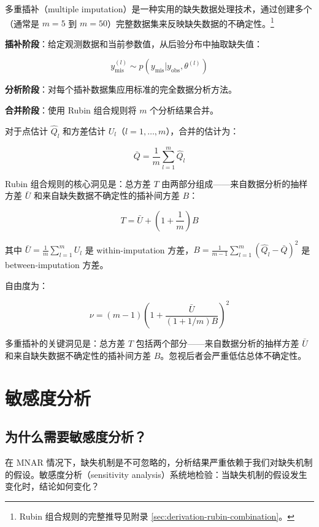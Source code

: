 多重插补（multiple imputation）是一种实用的缺失数据处理技术，通过创建多个（通常是 $m = 5$ 到 $m = 50$）完整数据集来反映缺失数据的不确定性。\footnote{Rubin 组合规则的完整推导见附录 \cref{sec:derivation-rubin-combination}。}

\textbf{插补阶段}：给定观测数据和当前参数值，从后验分布中抽取缺失值：

\[
y_{\text{mis}}^{(l)} \sim p(y_{\text{mis}} | y_{\text{obs}}, \theta^{(l)})
\label{eq:imputation-step}
\]

\textbf{分析阶段}：对每个插补数据集应用标准的完全数据分析方法。

\textbf{合并阶段}：使用 Rubin 组合规则将 $m$ 个分析结果合并。

对于点估计 $\hat{Q}_l$ 和方差估计 $U_l$（$l = 1, \ldots, m$），合并的估计为：

\[
\bar{Q} = \frac{1}{m} \sum_{l=1}^m \hat{Q}_l
\label{eq:rubin-pooled-estimate}
\]

Rubin 组合规则的核心洞见是：总方差 $T$ 由两部分组成——来自数据分析的抽样方差 $\bar{U}$ 和来自缺失数据不确定性的插补间方差 $B$：

\[
T = \bar{U} + \left(1 + \frac{1}{m}\right) B
\label{eq:rubin-total-variance}
\]

其中 $\bar{U} = \frac{1}{m} \sum_{l=1}^m U_l$ 是 within-imputation 方差，$B = \frac{1}{m-1} \sum_{l=1}^m (\hat{Q}_l - \bar{Q})^2$ 是 between-imputation 方差。

自由度为：

\[
\nu = (m-1)\left(1 + \frac{\bar{U}}{(1 + 1/m)B}\right)^2
\label{eq:rubin-degrees-freedom}
\]

\begin{Remark}
  多重插补的关键洞见是：总方差 $T$ 包括两个部分——来自数据分析的抽样方差 $\bar{U}$ 和来自缺失数据不确定性的插补间方差 $B$。忽视后者会严重低估总体不确定性。
\end{Remark}

\section{敏感度分析}
\label{sec:sensitivity-analysis}

\subsection{为什么需要敏感度分析？}
\label{sec:why-sensitivity-analysis}

在 MNAR 情况下，缺失机制是不可忽略的，分析结果严重依赖于我们对缺失机制的假设。敏感度分析（sensitivity analysis）系统地检验：当缺失机制的假设发生变化时，结论如何变化？

